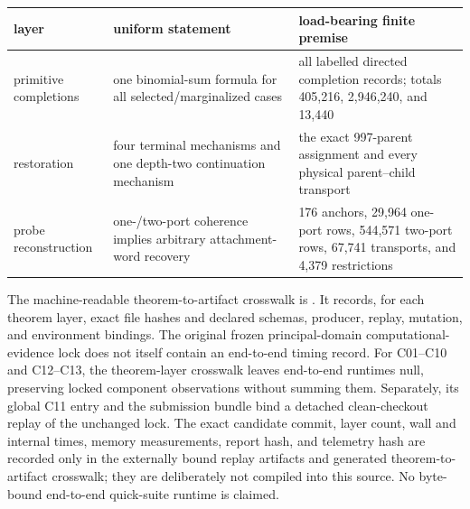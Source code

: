 \begin{center}
\small
\begin{tabular}{L{.27\linewidth}L{.27\linewidth}L{.36\linewidth}}
\toprule
layer & uniform statement & load-bearing finite premise\\
\midrule
primitive completions
& one binomial-sum formula for all selected/marginalized cases
& all labelled directed completion records; totals 405,216, 2,946,240,
  and 13,440\\
restoration
& four terminal mechanisms and one depth-two continuation mechanism
& the exact 997-parent assignment and every physical parent--child transport\\
probe reconstruction
& one-/two-port coherence implies arbitrary attachment-word recovery
& 176 anchors, 29,964 one-port rows, 544,571 two-port rows, 67,741
  transports, and 4,379 restrictions\\
\bottomrule
\end{tabular}
\end{center}

The machine-readable theorem-to-artifact crosswalk is
.
It records, for each theorem layer, exact file hashes and declared schemas,
producer, replay, mutation, and environment bindings.  The original frozen
principal-domain computational-evidence lock does not itself contain an
end-to-end timing record.  For C01--C10 and C12--C13, the theorem-layer
crosswalk leaves end-to-end runtimes null, preserving locked component
observations without summing them.  Separately, its global C11 entry and the
submission bundle bind a detached clean-checkout replay of the unchanged lock.
The exact candidate commit, layer count, wall and internal times, memory
measurements, report hash, and telemetry hash are recorded only in the
externally bound replay artifacts and generated theorem-to-artifact crosswalk;
they are deliberately not compiled into this source.  No byte-bound
end-to-end quick-suite runtime is claimed.
